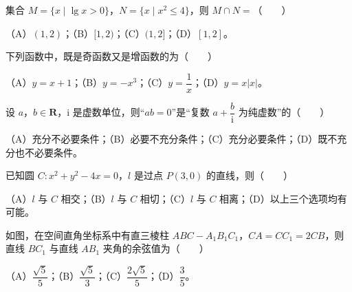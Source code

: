 

\begin{question}
集合 $M=\{x\mid\lg x>0\}$，$N=\{x\mid x^2\leqslant4\}$，则 $M\cap N=$\mbox{（　　）}

（A）$(1,2)$；（B）$[1,2)$；（C）$(1,2]$；（D）$[1,2]$。

\end{question}
\begin{question}
下列函数中，既是奇函数又是增函数的为\mbox{（　　）}

（A）$y=x+1$；（B）$y=-x^3$；（C）$y=\dfrac1x$；（D）$y=x|x|$。

\end{question}
\begin{question}
设 $a$，$b\in\mathbf R$，$\mathrm i$ 是虚数单位，则“$ab=0$”是“复数 $a+\dfrac b{\mathrm i}$ 为纯虚数”的\mbox{（　　）}

（A）充分不必要条件；（B）必要不充分条件；（C）充分必要条件；（D）既不充分也不必要条件。

\end{question}
\begin{question}
已知圆 $C:x^2+y^2-4x=0$，$l$ 是过点 $P(3,0)$ 的直线，则\mbox{（　　）}

（A）$l$ 与 $C$ 相交；（B）$l$ 与 $C$ 相切；（C）$l$ 与 $C$ 相离；（D）以上三个选项均有可能。

\Needspace{0.4\textheight}
\end{question}
\begin{question}
如图，在空间直角坐标系中有直三棱柱 $ABC-A_1B_1C_1$，$CA=CC_1=2CB$，则直线 $BC_1$ 与直线 $AB_1$ 夹角的余弦值为\mbox{（　　）}
\nopagebreak[4]
\begin{center}\end{center}
\nopagebreak[4]
（A）$\dfrac{\sqrt5}5$；（B）$\dfrac{\sqrt5}3$；（C）$\dfrac{2\sqrt5}5$；（D）$\dfrac35$。

\end{question}
